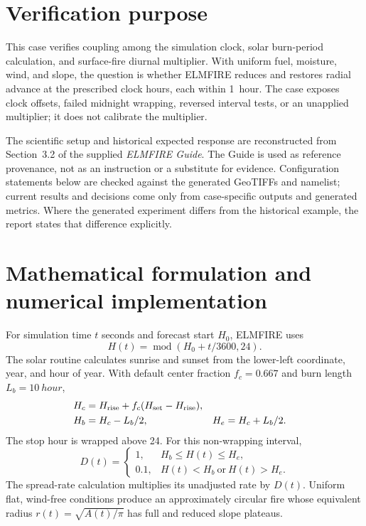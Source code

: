 \section{Verification purpose}

This case verifies coupling among the simulation clock, solar burn-period calculation, and surface-fire diurnal multiplier. With uniform fuel, moisture, wind, and slope, the question is whether ELMFIRE reduces and restores radial advance at the prescribed clock hours, each within \SI{1}{hour}. The case exposes clock offsets, failed midnight wrapping, reversed interval tests, or an unapplied multiplier; it does not calibrate the multiplier.

The scientific setup and historical expected response are reconstructed from Section~3.2 of the supplied \emph{ELMFIRE Guide}. The Guide is used as reference provenance, not as an instruction or a substitute for evidence. Configuration statements below are checked against the generated GeoTIFFs and namelist; current results and decisions come only from case-specific outputs and generated metrics. Where the generated experiment differs from the historical example, the report states that difference explicitly.

\section{Mathematical formulation and numerical implementation}

For simulation time $t$ seconds and forecast start $H_0$, ELMFIRE uses
\begin{equation}H(t)=\operatorname{mod}\!\left(H_0+t/3600,24\right).\end{equation}
The solar routine calculates sunrise and sunset from the lower-left coordinate, year, and hour of year. With default center fraction $f_c=0.667$ and burn length $L_b=\SI{10}{hour}$,
\begin{align}H_c&=H_{\rm rise}+f_c(H_{\rm set}-H_{\rm rise}),\\H_b&=H_c-L_b/2,&H_e&=H_c+L_b/2.\end{align}
The stop hour is wrapped above 24. For this non-wrapping interval,
\begin{equation}D(t)=\begin{cases}1,&H_b\le H(t)\le H_e,\\0.1,&H(t)<H_b\ \text{or}\ H(t)>H_e.\end{cases}\end{equation}
The spread-rate calculation multiplies its unadjusted rate by $D(t)$. Uniform flat, wind-free conditions produce an approximately circular fire whose equivalent radius $r(t)=\sqrt{A(t)/\pi}$ has full and reduced slope plateaus.

